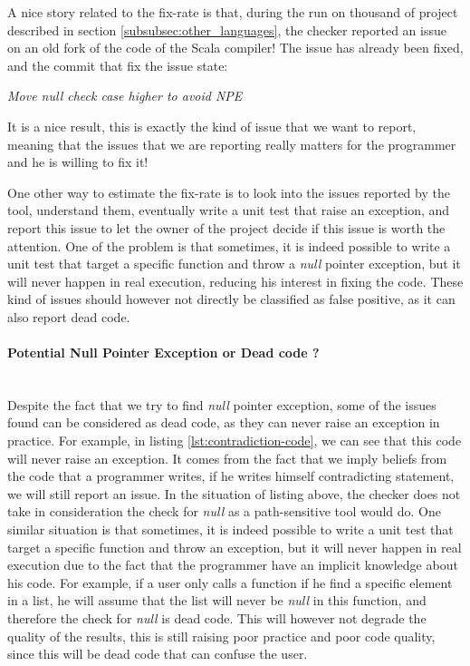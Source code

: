 A nice story related to the fix-rate is that, during the run on thousand of project described in section \ref{subsubsec:other_languages}, the checker reported an issue on an old fork of the code of the Scala compiler! 
The issue has already been fixed, and the commit that fix the issue state:

\begin{displayquote}
	\centering
	\textit{Move null check case higher to avoid NPE}
\end{displayquote}

It is a nice result, this is exactly the kind of issue that we want to report, meaning that the issues that we are reporting really matters for the programmer and he is willing to fix it!

One other way to estimate the fix-rate is to look into the issues reported by the tool, understand them, eventually write a unit test that raise an exception, and report this issue to let the owner of the project decide if this issue is worth the attention.
One of the problem is that sometimes, it is indeed possible to write a unit test that target a specific function and throw a \emph{null} pointer exception, but it will never happen in real execution, reducing his interest in fixing the code.
These kind of issues should however not directly be classified as false positive, as it can also report dead code.



\paragraph{Potential Null Pointer Exception or Dead code ?}\mbox{}\\
\label{subsubsec:dead_code}
Despite the fact that we try to find \emph{null} pointer exception, some of the issues found can be considered as dead code, as they can never raise an exception in practice. 
For example, in listing \ref{lst:contradiction-code}, we can see that this code will never raise an exception. 
It comes from the fact that we imply beliefs from the code that a programmer writes, if he writes himself contradicting statement, we will still report an issue.
In the situation of listing above, the checker does not take in consideration the check for \emph{null} as a path-sensitive tool would do. \newline
One similar situation is that sometimes, it is indeed possible to write a unit test that target a specific function and throw an exception, but it will never happen in real execution due to the fact that the programmer have an implicit knowledge about his code. 
For example, if a user only calls a function if he find a specific element in a list, he will assume that the list will never be \emph{null} in this function, and therefore the check for \emph{null} is dead code. 
This will however not degrade the quality of the results, this is still raising poor practice and poor code quality, since this will be dead code that can confuse the user.

